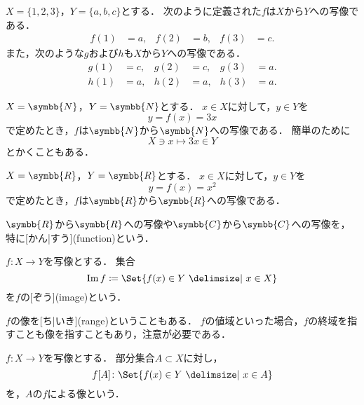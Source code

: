 \documentclass[../sotsu.tex]{subfiles}
\begin{document}
\begin{example}
    $X = \{ 1, 2, 3 \}$，$Y = \{ a, b, c \}$とする．
    次のように定義された$f$は$X$から$Y$への写像である．
    \begin{align*}
          f(1) &= a, 
        & f(2) &= b, 
        & f(3) &= c.
    \end{align*}
    また，次のような$g$および$h$も$X$から$Y$への写像である．
    \begin{align*}
          g(1) &= c,
        & g(2) &= c,
        & g(3) &= a.
        \\
          h(1) &= a,
        & h(2) &= a,
        & h(3) &= a.
    \end{align*}
\end{example}

\begin{example}
    $X = \symbb{N}$，$Y = \symbb{N}$とする．
    $x \in X$に対して，$y \in Y$を
    \[ y = f(x) = 3x \]
    で定めたとき，$f$は$\symbb{N}$から$\symbb{N}$への写像である．
    簡単のために
    \[ X \ni x \mapsto 3x \in Y \]
    とかくこともある．
\end{example}

\begin{example}
    $X = \symbb{R}$，$Y = \symbb{R}$とする．
    $x \in X$に対して，$y \in Y$を
    \[ y = f(x) = x^2 \]
    で定めたとき，$f$は$\symbb{R}$から$\symbb{R}$への写像である．

    $\symbb{R}$から$\symbb{R}$への写像や$\symbb{C}$から$\symbb{C}$への写像を，特に[かん|すう](function)という．
\end{example}

\begin{definition}[像]
    \label{dfn:image}
    $f \colon X \to Y$を写像とする．
    集合
    \begin{equation}
        \image f  \coloneq  \Set{ f(x) \in Y  \given  x \in X }
    \end{equation}
    を$f$の[ぞう](image)という．
\end{definition}

$f$の像を[ち|いき](range)ということもある．
$f$の値域といった場合，$f$の終域を指すことも像を指すこともあり，注意が必要である．

\begin{definition}[部分集合の像]
    $f \colon X \to Y$を写像とする．
    部分集合$A \subset X$に対し，
    \begin{equation}
        f[A] \colon \Set{  f(x) \in Y  \given  x \in A  }
    \end{equation}
    を，$A$の$f$による像という．
\end{definition}
\end{document}
